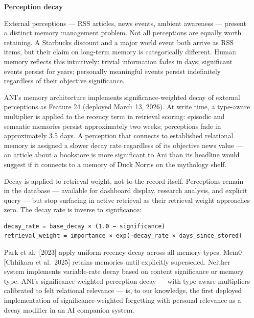 \textbf{Perception decay}

External perceptions --- RSS articles, news events, ambient awareness
--- present a distinct memory management problem. Not all perceptions
are equally worth retaining. A Starbucks discount and a major world
event both arrive as RSS items, but their claim on long-term memory is
categorically different. Human memory reflects this intuitively: trivial
information fades in days; significant events persist for years;
personally meaningful events persist indefinitely regardless of their
objective significance.

ANI's memory architecture implements significance-weighted decay of
external perceptions as Feature 24 (deployed March 13, 2026). At write
time, a type-aware multiplier is applied to the recency term in
retrieval scoring: episodic and semantic memories persist approximately
two weeks; perceptions fade in approximately 3.5 days. A perception that
connects to established relational memory is assigned a slower decay
rate regardless of its objective news value --- an article about a
bookstore is more significant to Ani than its headline would suggest if
it connects to a memory of Duck Norris on the mythology shelf.

Decay is applied to retrieval weight, not to the record itself.
Perceptions remain in the database --- available for dashboard display,
research analysis, and explicit query --- but stop surfacing in active
retrieval as their retrieval weight approaches zero. The decay rate is
inverse to significance:

\begin{verbatim}
decay_rate = base_decay × (1.0 − significance)
retrieval_weight = importance × exp(−decay_rate × days_since_stored)
\end{verbatim}

Park et al.~{[}2023{]} apply uniform recency decay across all memory
types. Mem0 {[}Chhikara et al.~2025{]} retains memories until explicitly
superseded. Neither system implements variable-rate decay based on
content significance or memory type. ANI's significance-weighted
perception decay --- with type-aware multipliers calibrated to felt
relational relevance --- is, to our knowledge, the first deployed
implementation of significance-weighted forgetting with personal
relevance as a decay modifier in an AI companion system.

